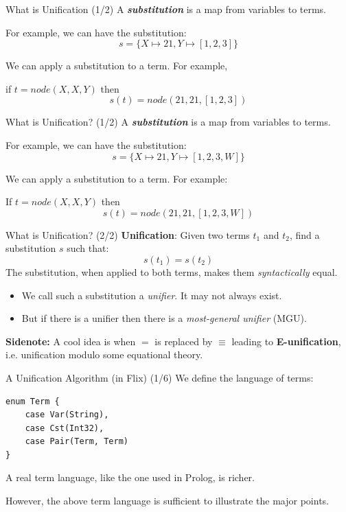 \begin{frame}{What is Unification (1/2)}
A \textbf{\emph{substitution}} is a map from variables to terms.

\pause

For example, we can have the substitution:
\[
    s = \{ X \mapsto 21, Y \mapsto [1, 2, 3] \} 
\]

\pause

We can apply a substitution to a term. For example, 

if $t = node(X, X, Y)$ then 
\[
    s(t) = node(21, 21, [1, 2, 3])
\]
\end{frame}  

\begin{frame}{What is Unification? (1/2)}
A \textbf{\emph{substitution}} is a map from variables to terms.

\pause

For example, we can have the substitution:
\[
    s = \{ X \mapsto 21, Y \mapsto [1, 2, 3, W] \} 
\]

\pause

We can apply a substitution to a term. For example: 

If $t = node(X, X, Y)$ then 
\[
    s(t) = node(21, 21, [1, 2, 3, W])
\]
\end{frame}  

\begin{frame}{What is Unification? (2/2)}
\textbf{Unification}: Given two terms $t_1$ and $t_2$, find a substitution $s$
such that:
%
\[
    s(t_1) = s(t_2)
\]
%
The substitution, when applied to both terms, makes them \emph{syntactically} equal. 
%
\begin{itemize}
    \item We call such a substitution a \emph{unifier}. It may not always exist.
    \item But if there is a unifier then there is a \emph{most-general unifier} (MGU).
\end{itemize}

\pause

\textbf{Sidenote:} A cool idea is when $=$ is replaced by $\equiv$ leading to
\textbf{E-unification}, i.e. unification modulo some equational theory. 
\end{frame}  

\begin{frame}[fragile]{A Unification Algorithm (in Flix) (1/6)}
We define the language of terms:

\begin{lstlisting}[language=flix, xleftmargin=0.5cm]
enum Term {
    case Var(String),
    case Cst(Int32),
    case Pair(Term, Term)
}
\end{lstlisting}

A real term language, like the one used in Prolog, is richer.

However, the above term language is sufficient to illustrate the major points. 
\end{frame}

